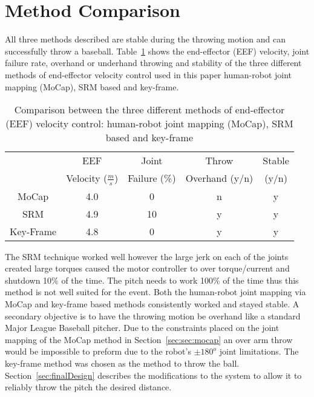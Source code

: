 \section{Method Comparison}\label{sec:comparison}
All three methods described are stable during the throwing motion and can successfully throw a baseball.  Table~\ref{table:comp} shows the end-effector (EEF) velocity, joint failure rate, overhand or underhand throwing and stability of the three different methods of end-effector velocity control used in this paper human-robot joint mapping (MoCap), SRM based and key-frame.


\begin{small}
\begin{table}[!t]
\renewcommand{\arraystretch}{1.3}
\caption{Comparison between the three different methods of end-effector (EEF) velocity control: human-robot joint mapping (MoCap), SRM based and key-frame}
\label{table:comp}
\centering
\begin{tabular}{|c|c|c|c|c|}
\hline
  				& EEF 																	& Joint 						& Throw						& Stable  			\\
  				& Velocity ($\frac{m}{s}$)							& Failure (\%)			& Overhand (y/n)	& (y/n)					\\
\hline	
MoCap 		& 4.0																		& 0									& n								& y 						\\
\hline
SRM 			& 4.9																		& 10								& y								& y							\\
\hline
Key-Frame & 4.8 																	& 0 								& y								&	y							\\
\hline
\end{tabular}
\end{table}
\end{small}

The SRM technique worked well however the large jerk on each of the joints created large torques caused the motor controller to over torque/current and shutdown 10\% of the time.  
The pitch needs to work 100\% of the time thus this method is not well suited for the event.  
Both the human-robot joint mapping via MoCap and key-frame based methods consistently worked and stayed stable.  A secondary objective is to have the throwing motion be overhand like a standard Major League Baseball pitcher.  
Due to the constraints placed on the joint mapping of the MoCap method in Section~\ref{sec:sec:mocap} an over arm throw would be impossible to preform due to the robot's $\pm180^o$ joint limitations.  The key-frame method was chosen as the method to throw the ball.  Section~\ref{sec:finalDesign} describes the modifications to the system to allow it to reliably throw the pitch the desired distance.